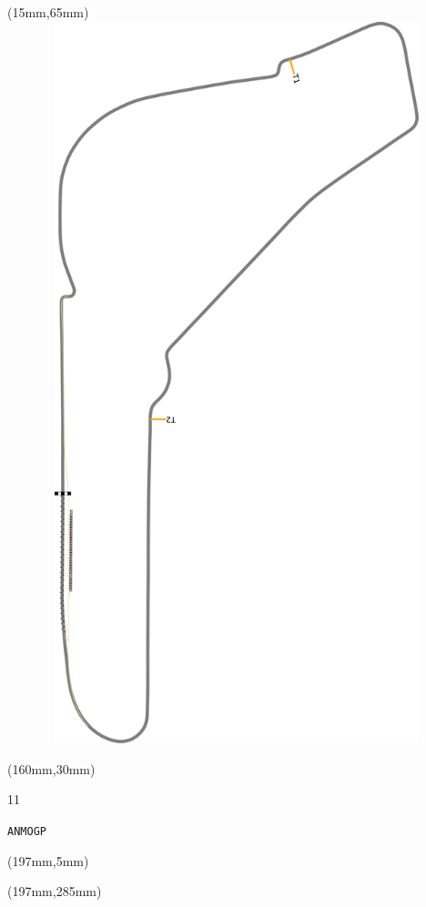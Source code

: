 \begin{textblock*}{185mm}(15mm,65mm)%
\centering
\mbox{\includegraphics[width=185mm,height=210mm,keepaspectratio]{PT/ANMOGP.pdf}}
\end{textblock*}
\begin{textblock*}{40mm}(160mm,30mm)%
\Large
\par{} 
\par11 
\par\hfill\tiny\tt ANMOGP\\
\end{textblock*}
\begin{textblock*}{20mm}(197mm,5mm)%
\fbox{\thepage}
\label{ANMOGP}
\end{textblock*}
\begin{textblock*}{20mm}(197mm,285mm)%
\fbox{\thepage}
\end{textblock*}

